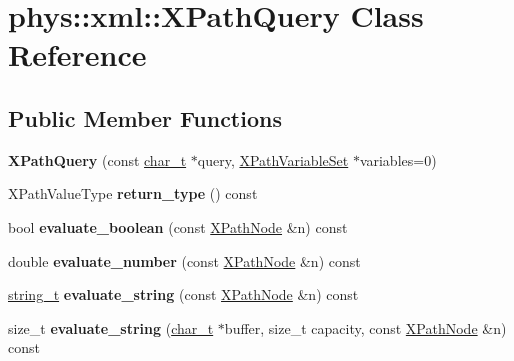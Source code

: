 \hypertarget{classphys_1_1xml_1_1XPathQuery}{
\section{phys::xml::XPathQuery Class Reference}
\label{de/d52/classphys_1_1xml_1_1XPathQuery}
}
\subsection*{Public Member Functions}
\begin{DoxyCompactItemize}
\item 
\hypertarget{classphys_1_1xml_1_1XPathQuery_a1a63135370ef4999f3dd27540c9009a2}{
{\bfseries XPathQuery} (const \hyperlink{namespacephys_1_1xml_afc87705cd1c2917d87b879715a2d8f6e}{char\_\-t} $\ast$query, \hyperlink{classphys_1_1xml_1_1XPathVariableSet}{XPathVariableSet} $\ast$variables=0)}
\label{de/d52/classphys_1_1xml_1_1XPathQuery_a1a63135370ef4999f3dd27540c9009a2}

\item 
\hypertarget{classphys_1_1xml_1_1XPathQuery_a707742d4a50e3aa02df27373f2bf6360}{
XPathValueType {\bfseries return\_\-type} () const }
\label{de/d52/classphys_1_1xml_1_1XPathQuery_a707742d4a50e3aa02df27373f2bf6360}

\item 
\hypertarget{classphys_1_1xml_1_1XPathQuery_a045c0650a983ceb24772975f0a9176d3}{
bool {\bfseries evaluate\_\-boolean} (const \hyperlink{classphys_1_1xml_1_1XPathNode}{XPathNode} \&n) const }
\label{de/d52/classphys_1_1xml_1_1XPathQuery_a045c0650a983ceb24772975f0a9176d3}

\item 
\hypertarget{classphys_1_1xml_1_1XPathQuery_a276e1854c0644c882e384ad433bb9ec3}{
double {\bfseries evaluate\_\-number} (const \hyperlink{classphys_1_1xml_1_1XPathNode}{XPathNode} \&n) const }
\label{de/d52/classphys_1_1xml_1_1XPathQuery_a276e1854c0644c882e384ad433bb9ec3}

\item 
\hypertarget{classphys_1_1xml_1_1XPathQuery_ad3869adac741a602b267a3006b0d3e40}{
\hyperlink{namespacephys_1_1xml_a6db751f2b35502e04c123bb70daa0d20}{string\_\-t} {\bfseries evaluate\_\-string} (const \hyperlink{classphys_1_1xml_1_1XPathNode}{XPathNode} \&n) const }
\label{de/d52/classphys_1_1xml_1_1XPathQuery_ad3869adac741a602b267a3006b0d3e40}

\item 
\hypertarget{classphys_1_1xml_1_1XPathQuery_a51840dda4891aeac6ec47569dede3e9a}{
size\_\-t {\bfseries evaluate\_\-string} (\hyperlink{namespacephys_1_1xml_afc87705cd1c2917d87b879715a2d8f6e}{char\_\-t} $\ast$buffer, size\_\-t capacity, const \hyperlink{classphys_1_1xml_1_1XPathNode}{XPathNode} \&n) const }
\label{de/d52/classphys_1_1xml_1_1XPathQuery_a51840dda4891aeac6ec47569dede3e9a}


\end{DoxyCompactItemize}
